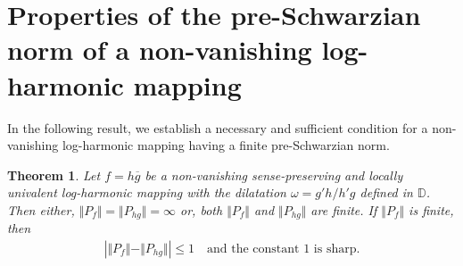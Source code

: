 \documentclass[12pt,reqno]{amsart}
\newtheorem{thm}{Theorem}[section]
\newtheorem{open problem}{Open problem}[section]
\newcommand{\beas}{\begin{eqnarray*}}
\newcommand{\eeas}{\end{eqnarray*}}
\numberwithin{equation}{section}
\begin{document}
\section{Properties of the pre-Schwarzian norm of a non-vanishing log-harmonic mapping}
\noindent In the following result, we establish a necessary and sufficient condition for a non-vanishing log-harmonic mapping having a finite pre-Schwarzian norm.
\begin{thm}\label{Th0}
Let $f=h\overline{g}$ be a non-vanishing sense-preserving and locally univalent log-harmonic mapping with the dilatation $\omega=g'h/h'g$ defined in $\mathbb{D}$. Then either, $\Vert P_f \Vert =\Vert P_{hg}\Vert =\infty$ or, both $\Vert P_f \Vert $ and $\Vert P_{hg}\Vert $ are finite. If $\Vert P_f \Vert $ is finite, then
\beas
\left|\Vert P_f \Vert -\Vert P_{hg}\Vert \right|\leq 1\quad\text{and the constant $1$ is sharp.}\eeas
\end{thm}
\end{document}
